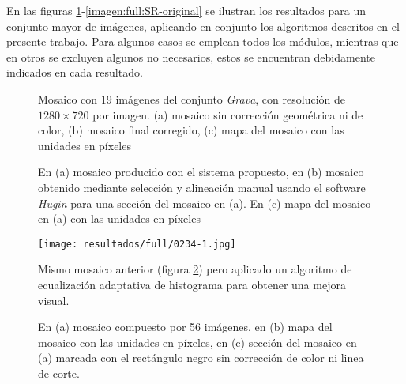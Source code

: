 En las figuras \ref{imagen:full:geo2}-\ref{imagen:full:SR-original} se ilustran los resultados para un conjunto mayor de imágenes, aplicando en conjunto los algoritmos descritos en el presente trabajo. Para algunos casos se emplean todos los módulos, mientras que en otros se excluyen algunos no necesarios, estos se encuentran debidamente indicados en cada resultado.

\begin{figure}[H]
	\centering     %
		
	\caption[Mosaico del conjunto \textit{Grava}]{Mosaico con 19 imágenes del conjunto \textit{Grava}, con resolución de $1280\times 720$ por imagen. (a) mosaico sin corrección geométrica ni de color, (b) mosaico final corregido, (c) mapa del mosaico con las unidades en píxeles}
	\label{imagen:full:geo2}
\end{figure}

\begin{figure}[H]
	\centering     %
	
	\caption[Mosaico del conjunto \textit{Chuspa}]{En (a) mosaico producido con el sistema propuesto, en (b) mosaico obtenido mediante selección y alineación manual usando el software \textit{Hugin} para una sección del mosaico en (a). En (c) mapa del mosaico en (a) con las unidades en píxeles}
	\label{imagen:full:0234-map}
\end{figure}

\begin{figure}[H]
	\centering
	\texttt{[image: resultados/full/0234-1.jpg]}
	\caption[Mosaico mejorado visualmente del conjunto \textit{Chuspa}]{Mismo mosaico anterior (figura \ref{imagen:full:0234-map}) pero aplicado un algoritmo de ecualización adaptativa de histograma para obtener una mejora visual.}
	\label{imagen:full:0234-1}
\end{figure}

\begin{figure}[H]
	\centering     %
	
	\caption[Mosaico del conjunto \textit{ScottReef 25}]{En (a) mosaico compuesto por 56 imágenes, en (b) mapa del mosaico con las unidades en píxeles, en (c) sección del mosaico en (a) marcada con el rectángulo negro sin corrección de color ni linea de corte.}
	\label{imagen:full:SR}
\end{figure}


